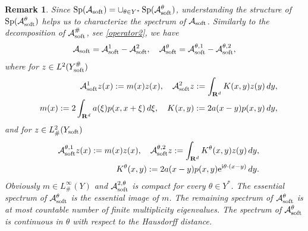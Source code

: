 \documentclass[11pt]{article}
\newcommand\soft{{\rm soft}}
\def\rme{{\rm e}}
\def\rmi{{\rm i}}
\newcommand{\R}{\mathbf{R}}
\def\AA{\mathcal{A}}
\DeclareMathOperator{\Sp}{Sp}
\newtheorem{remark}[theorem]{Remark}
\theoremstyle{remark}
\begin{document}
\begin{remark}
	Since $\Sp(\AA_\soft)=\cup_{\theta \in Y^*} \Sp(\AA_\soft^\theta)$, understanding the structure of $\Sp(\AA_\soft^\theta)$ helps us to  characterize the spectrum of $\AA_\soft$.  Similarly to the decomposition of  $\AA_\soft^\#$, see \eqref{operator2},  we have
	\begin{equation*}
		\AA_\soft =\AA_\soft^1-\AA_\soft^2,\quad \AA_\soft^{\theta} =\AA_\soft^{\theta,1} -\AA_\soft^{\theta,2},
	\end{equation*}
	where for $z \in L^2(Y_\soft^\#)$
	\begin{eqnarray*} & &  \AA_\soft^1 z(x):=m(x)z(x),\quad \AA_\soft^2 z:=\int_{\R^d} K(x,y) z(y) \,dy, \\ & &
		m(x):=2\int_{\R^d} a(\xi)p(x,x+\xi)\,d\xi,\quad  K(x,y):=2  a(x-y)p(x,y)\,dy,
	\end{eqnarray*}
	and for $z \in L^2_\#(Y_\soft)$
	\begin{eqnarray*} & &  \AA_\soft^{\theta,1} z(x):=m(x)z(x),\quad \AA_\soft^{\theta,2}z:=\int_{\R^d} K^{\theta}(x,y) z(y) \,dy, \\ & &
		K^{\theta}(x,y):=2   a(x-y )p(x,y)\rme^{\rmi \theta \cdot(x-y )}\,dy.
	\end{eqnarray*}
	Obviously $m \in L_{\#}^{\infty} (Y)$ and $\AA_\soft^{2,\theta}$ is compact for every $\theta \in Y^*$. The essential spectrum of $\AA_\soft^{\theta}$ is the essential image of $m$. The remaining spectrum of  $\AA_\soft^{\theta}$  is at most countable number of finite multiplicity eigenvalues. The spectrum of $\AA_\soft^{\theta}$ is continuous in $\theta$ with respect to the Hausdorff distance.
\end{remark} 	
\end{document}
